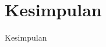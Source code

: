 \documentclass[aspectratio=169]{beamer}
\newenvironment{rbox}[1]{
	\setbeamercolor{block body}{bg=mygreen!4,fg=black}
	\setbeamercolor{block title}{bg=mygreen!90,fg=white}
	\begin{block}{#1}}{\end{block}}
\begin{document}
    

     

\section{\color{mygreen}\huge Kesimpulan}
\begin{frame}{Kesimpulan}
 
\end{frame}


\end{document}
